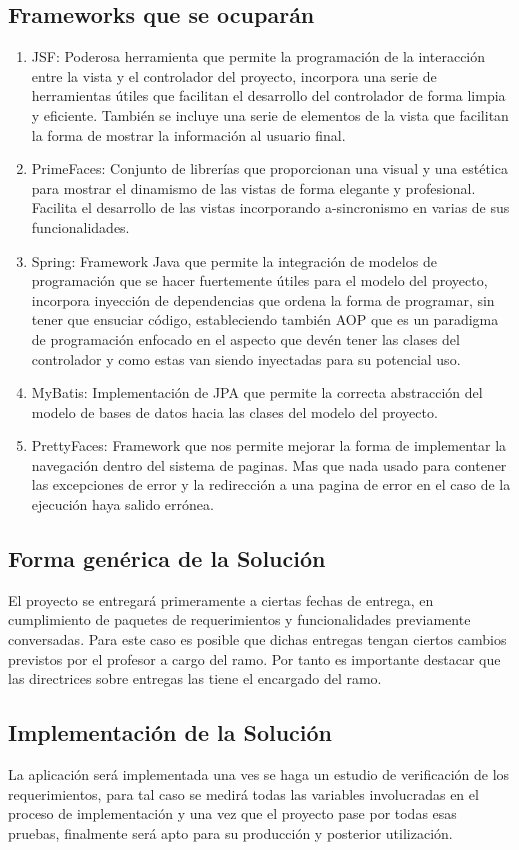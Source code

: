 \documentclass[a4paper,12pt,openany,oneside]{book}
\begin{document}
\subsection{Frameworks que se ocuparán}
\begin{enumerate}
\item JSF: Poderosa herramienta que permite la programación de la interacción entre la vista y el controlador del proyecto, incorpora una serie de herramientas útiles que facilitan el desarrollo del controlador de forma limpia y eficiente. También se incluye una serie de elementos de la vista que facilitan la forma de mostrar la información al usuario final.
\item PrimeFaces: Conjunto de librerías que proporcionan una visual y una estética para mostrar el dinamismo de las vistas de forma elegante y profesional. Facilita el desarrollo de las vistas incorporando a-sincronismo en varias de sus funcionalidades. 
\item Spring: Framework Java que permite la integración de modelos de programación que se hacer fuertemente útiles para el modelo del proyecto, incorpora inyección de dependencias que ordena la forma de programar, sin tener que ensuciar código, estableciendo también AOP que es un paradigma de programación enfocado en el aspecto que devén tener las clases del controlador y como estas van siendo inyectadas para su potencial uso. 
\item MyBatis: Implementación de JPA que permite la correcta abstracción del modelo de bases de datos hacia las clases del modelo del proyecto.
\item PrettyFaces: Framework que nos permite mejorar la forma de implementar la navegación dentro del sistema de paginas. Mas que nada usado para contener las excepciones de error y la redirección a una pagina de error en el caso de la ejecución haya salido errónea.
\end{enumerate}
\subsection{Forma genérica de la Solución}
El proyecto se entregará primeramente a ciertas fechas de entrega, en cumplimiento de paquetes de requerimientos y funcionalidades previamente conversadas. Para este caso es posible que dichas entregas tengan ciertos cambios previstos por el profesor a cargo del ramo. Por tanto es importante destacar que las directrices sobre entregas las tiene el encargado del ramo.
\subsection{Implementación de la Solución}
La aplicación será implementada una ves se haga un estudio de verificación de los requerimientos, para tal caso se medirá todas las variables involucradas en el proceso de implementación y una vez que el proyecto pase por todas esas pruebas, finalmente será apto para su producción y posterior utilización.
\end{document}
